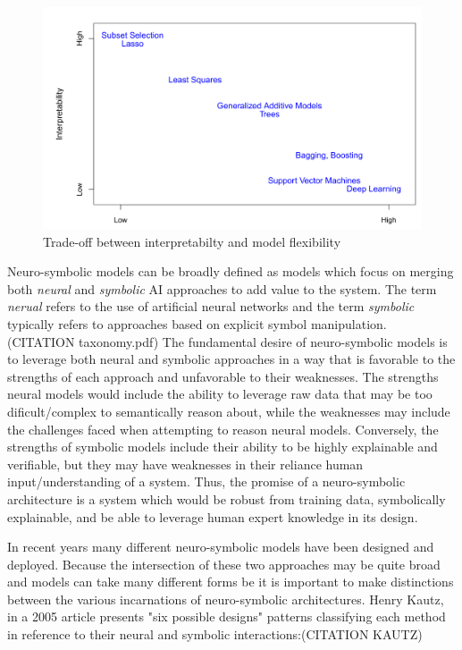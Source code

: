 \begin{figure}[htb]
	\centering
	\includegraphics[scale=0.25]{./images/interpretability_vs_flexibility.png}
	\caption{Trade-off between interpretabilty and model flexibility \cite{james2013introduction}} 
\end{figure}

Neuro-symbolic models can be broadly defined as models which focus on merging both \textit{neural} and \textit{symbolic} AI approaches to add value to the system. The term \textit{nerual} refers to the use of artificial neural networks and the term \textit{symbolic} typically refers to approaches based on explicit symbol manipulation. (CITATION taxonomy.pdf) The fundamental desire of neuro-symbolic models is to leverage both neural and symbolic approaches in a way that is favorable to the strengths of each approach and unfavorable to their weaknesses. The strengths neural models would include the ability to leverage raw data that may be too dificult/complex to semantically reason about, while the weaknesses may include the challenges faced when attempting to reason neural models. Conversely, the strengths of symbolic models include their ability to be highly explainable and verifiable, but they may have weaknesses in their reliance human input/understanding of a system. Thus, the promise of a neuro-symbolic architecture is a system which would be robust from training data, symbolically explainable, and be able to leverage human expert knowledge in its design. 

In recent years many different neuro-symbolic models have been designed and deployed. Because the intersection of these two approaches may be quite broad and models can take many different forms be it is important to make distinctions between the various incarnations of neuro-symbolic architectures. Henry Kautz, in a 2005 article presents "six possible designs" patterns classifying each method in reference to their neural and symbolic interactions:(CITATION KAUTZ)

